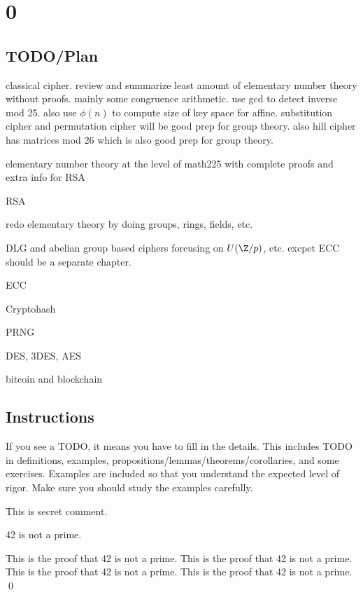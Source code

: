 \chapter{0}

\section{TODO/Plan}

\begin{myenum}
\item classical cipher.
  review and summarize
  least amount of elementary number theory without
  proofs. mainly some congruence arithmetic.
  use gcd to detect inverse mod 25. also use $\phi(n)$ to compute
  size of key space for affine.
  substitution cipher and permutation cipher will be good prep for
  group theory.
  also hill cipher has matrices mod 26 which is also good prep for group
  theory.
\item elementary number theory at the level of math225 with complete proofs
  and extra info for RSA
\item RSA
\item redo elementary theory by doing groups, rings, fields, etc.
\item DLG and abelian group based ciphers forcusing on $U(\Z/p)$, etc.
  excpet ECC should be a separate chapter.
\item ECC
\item Cryptohash
\item PRNG
\item DES, 3DES, AES
\item bitcoin and blockchain
\end{myenum}


\section{Instructions}

If you see a TODO, it means you have to fill in the details.
This includes TODO in definitions,
examples,
propositions/lemmas/theorems/corollaries,
and some exercises.
Examples are included so that you understand the expected level of rigor.
Make sure you should study the examples carefully.


\BEGINCOMMENT
This is secret comment.
\ENDCOMMENT

\begin{thm}
  42 is not a prime.
\end{thm}
\proof
\BEGINTODO
This is the proof that 42 is not a prime.
This is the proof that 42 is not a prime.
This is the proof that 42 is not a prime.
This is the proof that 42 is not a prime.
\qed
\ENDTODO

